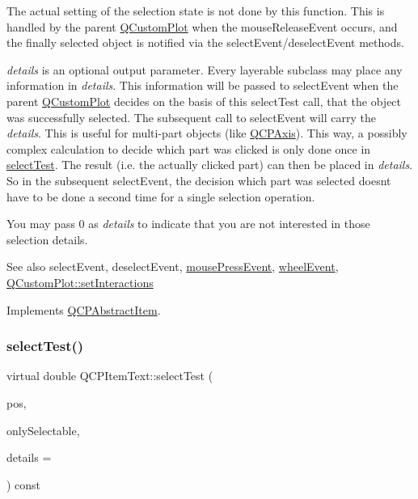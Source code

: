 The actual setting of the selection state is not done by this function. This is handled by the parent \hyperlink{class_q_custom_plot}{Q\+Custom\+Plot} when the mouse\+Release\+Event occurs, and the finally selected object is notified via the select\+Event/deselect\+Event methods.

{\itshape details} is an optional output parameter. Every layerable subclass may place any information in {\itshape details}. This information will be passed to select\+Event when the parent \hyperlink{class_q_custom_plot}{Q\+Custom\+Plot} decides on the basis of this select\+Test call, that the object was successfully selected. The subsequent call to select\+Event will carry the {\itshape details}. This is useful for multi-\/part objects (like \hyperlink{class_q_c_p_axis}{Q\+C\+P\+Axis}). This way, a possibly complex calculation to decide which part was clicked is only done once in \hyperlink{class_q_c_p_item_text_a676aaec10ad3cc4d7d0e4847db04c838}{select\+Test}. The result (i.\+e. the actually clicked part) can then be placed in {\itshape details}. So in the subsequent select\+Event, the decision which part was selected doesn\textquotesingle{}t have to be done a second time for a single selection operation.

You may pass 0 as {\itshape details} to indicate that you are not interested in those selection details.

\begin{DoxySeeAlso}{See also}
select\+Event, deselect\+Event, \hyperlink{class_q_c_p_layerable_af6567604818db90f4fd52822f8bc8376}{mouse\+Press\+Event}, \hyperlink{class_q_c_p_layerable_a47dfd7b8fd99c08ca54e09c362b6f022}{wheel\+Event}, \hyperlink{class_q_custom_plot_a5ee1e2f6ae27419deca53e75907c27e5}{Q\+Custom\+Plot\+::set\+Interactions} 
\end{DoxySeeAlso}


Implements \hyperlink{class_q_c_p_abstract_item_ae41d0349d68bb802c49104afd100ba2a}{Q\+C\+P\+Abstract\+Item}.

\mbox{\label{class_q_c_p_item_text_ab9d7938a7445f16a00391e9355a5ceaa}} 
\subsubsection{\texorpdfstring{select\+Test()}{selectTest()}\hspace{0.1cm}{\footnotesize\ttfamily [2/2]}}
{\footnotesize\ttfamily virtual double Q\+C\+P\+Item\+Text\+::select\+Test (\begin{DoxyParamCaption}\item[{const Q\+PointF \&}]{pos,  }\item[{bool}]{only\+Selectable,  }\item[{Q\+Variant $\ast$}]{details = {} }\end{DoxyParamCaption}) const\hspace{0.3cm}{\ttfamily [virtual]}}

